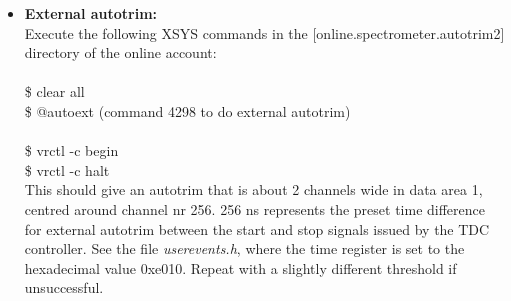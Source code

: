\documentclass[11pt]{report}
\begin{document}
\begin{itemize}
This should show an internal autotrim that is 6 or 7 channels wide in 
data area 1, with both X chambers and the Y chamber being centred roughly
around channel number 182\footnote{ Due to a bug in XSYS the graphics window does not always automatically update. Without this knowledge one may think that the latest run's results are exactly the same as the previous run, and that any hardware changes made had no effect on the autotrim. To avoid this common error make a habit of viewing data area 2 before looking at data area 1 for each new run. In this way you will know that you always view the real data for data area 1}.
\\
\begin{figure}[!ht]
\centerline{\vspace{0cm}\hspace{0cm}
}
\centering
\caption{An overview of typical internal autotrim results for half of the channels for VDC1 and VDC2.}
\label{fig:autotrim-internal-1}
\end{figure} 


\begin{figure}[!ht]
\centerline{\vspace{0cm}\hspace{0cm}
}
\centering
\caption{A close-up view of typical internal autotrim results.}
\label{fig:autotrim-internal-2}
\end{figure} 



\item {\bf External autotrim:}\\
Execute the following XSYS commands in the [online.spectrometer.autotrim2]
directory of the online account:
\\
\\ \indent \$	clear all
\\ \indent \$	@autoext   \hspace{1.6cm}  (command 4298 to do external autotrim)\\
\\ \indent \$	vrctl -c begin
\\ \indent \$	vrctl -c halt\\

This should give an autotrim that is about 2 channels wide in 
data area 1, centred around channel nr 256.
256 ns represents the preset time difference for external autotrim between the start and stop signals issued by the TDC controller. See the file {\it userevents.h}, where the time register is set to the hexadecimal value 0xe010. 
Repeat with a slightly different threshold if unsuccessful.
\\
\end{itemize}
\end{document}
